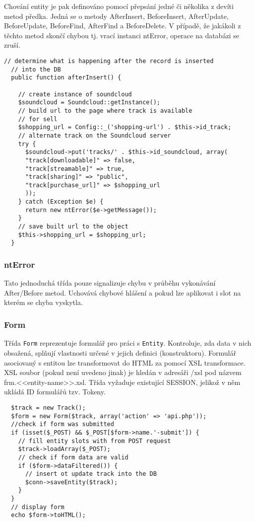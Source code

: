 \documentclass[12pt]{article}
\begin{document}
Chování entity je pak definováno pomocí přepsání jedné či několika z devíti metod předka.
Jedná se o metody AfterInsert, BeforeInsert, AfterUpdate, BeforeUpdate, BeforeFind, AfterFind a BeforeDelete.
V případě, že jakákoli z těchto metod skončí chybou tj. vrací instanci ntError, operace na databázi se zruší.
\begin{lstlisting}[caption={metoda afterInsert}, label={afterinsert}]
  // determine what is happening after the record is inserted
  // into the DB
  public function afterInsert() {

    // create instance of soundcloud
    $soundcloud = Soundcloud::getInstance();
    // build url to the page where track is available
    // for sell
    $shopping_url = Config::_('shopping-url') . $this->id_track;
    // alternate track on the Soundcloud server
    try {
      $soundcloud->put('tracks/' . $this->id_soundcloud, array(
      "track[downloadable]" => false,
      "track[streamable]" => true,
      "track[sharing]" => "public",
      "track[purchase_url]" => $shopping_url
      ));
    } catch (Exception $e) {
      return new ntError($e->getMessage());
    }
    // save built url to the object
    $this->shopping_url = $shopping_url;
  }
\end{lstlisting}

\subsubsection{ntError}
Tato jednoduchá třída pouze signalizuje chybu v průběhu vykonávání After/Before metod. Uchovává chybové hlášení a pokud lze aplikovat i slot na kterém se chyba vyskytla.

\subsubsection{Form}
Třída \verb|Form| reprezentuje formulář pro práci s \verb|Entity|. Kontroluje, zda data v nich obsažená, splňují vlastnosti určené v jejich definici (konstruktoru). Formulář asociovaný s entitou lze transformovat do HTML za pomocí XSL transformace. XSL soubor (pokud není uvedeno jinak) je hledán v adresáři /xsl pod názvem frm.<<entity-name>>.xsl. Třída vyžaduje existující SESSION, jelikož v něm ukládá ID formulářů tzv. Tokeny.

\begin{lstlisting}
  $track = new Track();
  $form = new Form($track, array('action' => 'api.php'));
  //check if form was submitted
  if (isset($_POST) && $_POST[$form->name.'-submit']) {
    // fill entity slots with from POST request
    $track->loadArray($_POST);
    // check if form data are valid
    if ($form->dataFiltered()) {
      // insert ot update track into the DB
      $conn->saveEntity($track);
    }
  }
  // display form
  echo $form->toHTML();
\end{lstlisting}
\end{document}
